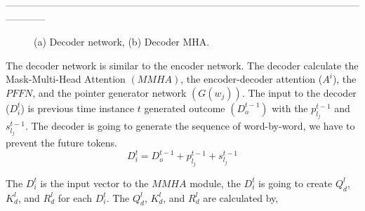 \documentclass[preprint,review,12pt]{elsarticle}
\begin{document}
\begin{comment}
We pass the $Q_t^l$, the $K_t^l$, and the $R_t^l$ to the MHA layer in the decoder, which is similar to the MHA in the encoder network. Note that, the PFFN layer is present in the encoder networks and the decoder networks.  Then the output of second $MHA$ is goes as the input to $PFFN$ for further processing of the data. Finally, we pass the generated outcomes to the linear layer (dense layer). The resultant flatten vector will pass to the summarization layer $SL$ which consists of softmax activation function. It will generate the maximum probability outcomes. This process is autoregressive,untill we reach to the end of the sentence (end-token) we pass the output of the SL layer which acts as the classifier. The outcome of the decoder is final summary for the MI data. 

\end{comment}






------------------------------------------------------------------------------------------------------------------------

\begin{figure}[]
	\begin{center}		
		\qquad
		\qquad
		\qquad
	\end{center}
	\vspace*{-\baselineskip}
	\caption{(a) Decoder network, (b) Decoder MHA. } 
\end{figure}
The decoder network is  similar to the encoder network. The decoder  calculate the  Mask-Multi-Head Attention $(MMHA)$, the encoder-decoder attention ($A^i$), the $PFFN$, and the pointer generator network $(G(w_j))$. The input to the decoder ($D_{i}^t$) is previous time instance $t$ generated outcome $(D_{o}^{t-1})$  with the $p_{l_j}^{t-1}$ and $s_{l_j}^{t-1}$. The decoder is going to  generate the sequence of word-by-word, we have to prevent the future tokens.
	\begin{equation}  \label{eq8}
	D_{i}^t = D_{o}^{t-1} + p_{l_j}^{t-1} + s_{l_j}^{t-1}
	\end{equation}

The $D_{i}^t$ is the input vector to the $MMHA$ module, the $D_{i}^t$ is going to create  $Q_{d}^l$, $K_{d}^l$, and $R_{d}^l$ for each $D_{i}^t$. The $Q_{d}^l$, $K_{d}^l$, and $R_{d}^l$ are calculated by,
\end{document}
